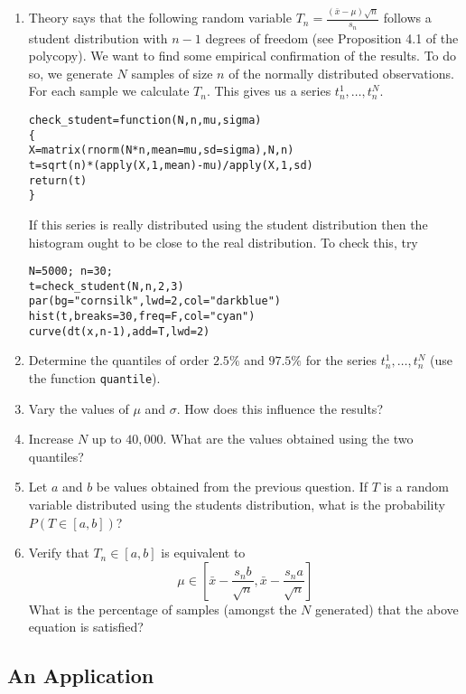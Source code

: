 \documentclass[a4paper,10pt]{article}
\begin{document}
\begin{enumerate}
 \item Theory says that the following random variable $T_n = \frac{(\bar{x}-\mu)\sqrt{n}}{s_n}$ follows a student distribution with $n-1$ degrees of freedom (see Proposition 4.1 of the polycopy). We want to find some empirical confirmation of the results. To do so, we generate $N$ samples of size $n$ of the normally distributed observations. For each sample we calculate $T_n$. This gives us a series $t_n^1, \ldots, t_n^N$. 
\begin{lstlisting}
check_student=function(N,n,mu,sigma)
{
X=matrix(rnorm(N*n,mean=mu,sd=sigma),N,n)
t=sqrt(n)*(apply(X,1,mean)-mu)/apply(X,1,sd)
return(t)
} 
\end{lstlisting}
If this series is really distributed using the student distribution then the histogram ought to be close to the real distribution. To check this, try 
\begin{lstlisting}
N=5000; n=30;
t=check_student(N,n,2,3)
par(bg="cornsilk",lwd=2,col="darkblue")
hist(t,breaks=30,freq=F,col="cyan")
curve(dt(x,n-1),add=T,lwd=2)
\end{lstlisting}

\item Determine the quantiles of order $2.5\%$ and $97.5\%$ for the series $t_n^1, \ldots, t_n^N$ (use the function \texttt{quantile}). 
\item Vary the values of $\mu$ and $\sigma$. How does this influence the results? 
\item Increase $N$ up to $40,000$. What are the values obtained using the two quantiles? 
\item Let $a$ and $b$ be values obtained from the previous question. If $T$ is a random variable distributed using the students distribution, what is the probability $P(T \in [a, b])$? 
\item Verify that $T_n \in [a, b]$ is equivalent to 
\begin{equation}
\mu \in \left[\bar{x} - \frac{s_n b}{\sqrt{n}}, \bar{x} - \frac{s_n a}{\sqrt{n}} \right] \label{eqn:student} 
\end{equation}
What is the percentage of samples (amongst the $N$ generated) that the above equation is satisfied? 
\end{enumerate}

\subsection{An Application}
\end{document}
